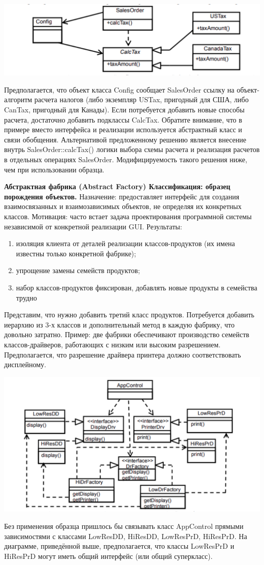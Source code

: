 \includegraphics[scale=0.07]{pics/5_2.png}

Предполагается, что объект класса Config сообщает SalesOrder ссылку на объект-алгоритм расчета налогов (либо экземпляр USTax, пригодный для США, либо CanTax, пригодный для Канады). Если потребуется добавить новые способы расчета, достаточно добавить подклассы CalcTax. Обратите внимание, что в примере вместо интерфейса и реализации используется абстрактный класс и связи обобщения. Альтернативой предложенному решению является внесение внутрь SalesOrder::calcTax() логики выбора схемы расчета и реализация расчетов в отдельных операциях SalesOrder. Модифицируемость такого решения ниже, чем при использовании образца.

\textbf{Абстрактная фабрика (Abstract Factory) Классификация: образец порождения объектов.} Назначение: предоставляет интерфейс для создания взаимосвязанных и взаимозависимых объектов, не определяя их конкретных классов. Мотивация: часто встает задача проектирования программной системы независимой от конкретной реализации GUI. Результаты:
\begin{enumerate}
    \item изоляция клиента от деталей реализации классов-продуктов (их имена известны только конкретной фабрике);
    \item упрощение замены семейств продуктов;
    \item набор классов-продуктов фиксирован, добавлять новые продукты в семейства трудно
\end{enumerate}

Представим, что нужно добавить третий класс продуктов. Потребуется добавить иерархию из 3-х классов и дополнительный метод в каждую фабрику, что довольно затратно. Пример: две фабрики обеспечивают производство семейств классов-драйверов, работающих с низким или высоким разрешением. Предполагается, что разрешение драйвера принтера должно соответствовать дисплейному.

\includegraphics[scale=0.08]{pics/5_3.png}

Без применения образца пришлось бы связывать класс AppControl прямыми зависимостями с классами LowResDD, HiResDD, LowResPrD, HiResPrD. На диаграмме, приведённой выше, предполагается, что классы LowResPrD и HiResPrD могут иметь общий интерфейс (или общий суперкласс).